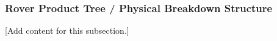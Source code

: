 
\subsubsection{Rover Product Tree / Physical Breakdown Structure}
\label{subsubsec:design_1_1_1_rover_product_tree}

[Add content for this subsection.]
